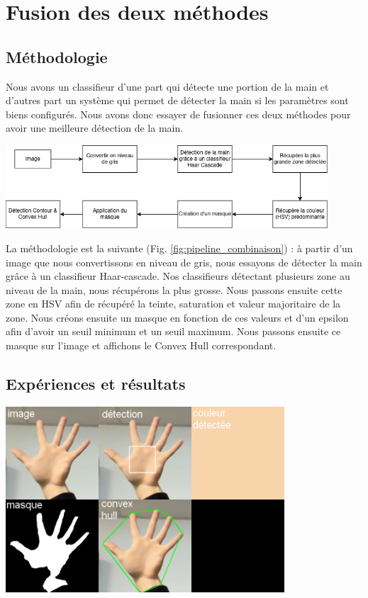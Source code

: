 \documentclass[11pt]{article}
\begin{document}
\newpage

\section{Fusion des deux méthodes}
\subsection{Méthodologie}
Nous avons un classifieur d'une part qui détecte une portion de la main et d'autres part un système qui permet de détecter la main si les paramètres sont biens configurés. Nous avons donc essayer de fusionner ces deux méthodes pour avoir une meilleure détection de la main. 

\begin{center}
    \includegraphics[width=0.9\textwidth]{images/pipeline_combinaison.png}
    \label{fig:pipeline_combinaison}
\end{center}

La méthodologie est la suivante (Fig. \ref{fig:pipeline_combinaison}) : à partir d'un image que nous convertissons en niveau de gris, nous essayons de détecter la main grâce à un classifieur Haar-cascade. Nos classifieurs détectant plusieurs zone au niveau de la main, nous récupérons la plus grosse. Nous passons ensuite cette zone en HSV afin de récupéré la teinte, saturation et valeur majoritaire de la zone. Nous créons ensuite un masque en fonction de ces valeurs et d'un epsilon afin d'avoir un seuil minimum et un seuil maximum. Nous passons ensuite ce masque sur l'image et affichons le Convex Hull correspondant.  

\subsection{Expériences et résultats}


\begin{center}
    \includegraphics[width=0.78\textwidth]{images/res_combinaison_5_doigts.png}
    \label{fig:res_combinaison_5_doigts}
\end{center}
\end{document}
